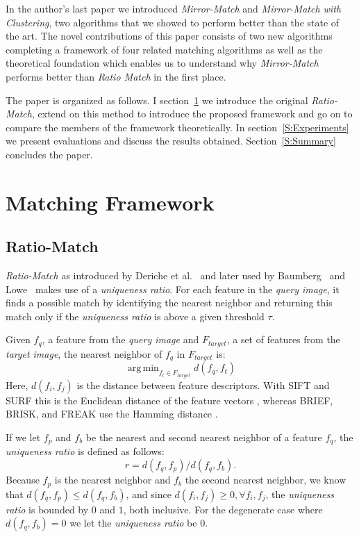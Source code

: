 \documentclass[10pt,journal,cspaper,compsoc]{IEEEtran}
\DeclareMathOperator*{\argmin}{arg\,min}
\begin{document}
In the author's last paper we introduced \emph{Mirror-Match} and 
\emph{Mirror-Match with Clustering}, two algorithms that we showed to 
perform better than the state of the art. The novel contributions of 
this paper consists of two new algorithms completing a framework of four 
related matching algorithms as well as the theoretical foundation which 
enables us to understand why \emph{Mirror-Match} performs better than 
\emph{Ratio Match} in the first place.

The paper is organized as follows. I section~\ref{S:MatchingMethods} we 
introduce the original \emph{Ratio-Match}, extend on this method to 
introduce the proposed framework and go on to compare the members of the 
framework theoretically.  In section~\ref{S:Experiments} we present 
evaluations and discuss the results obtained.  Section~\ref{S:Summary} 
concludes the paper.

\section{Matching Framework}
\label{S:MatchingMethods}
%
\subsection{Ratio-Match}
%
\emph{Ratio-Match} as introduced by Deriche et al.\ 
\cite{deriche1994robust} and later used by 
Baumberg~\cite{baumberg2000reliable} and Lowe~\cite{lowe2004sift} makes 
use of a \emph{uniqueness ratio}. For each feature in the \emph{query 
image}, it finds a possible match by identifying the nearest neighbor and 
returning this match only if the \emph{uniqueness ratio} is above a 
given threshold $\tau$. 

Given $f_q$, a feature from the \emph{query 
image} and $F_{target}$, a set of features from the \emph{target image}, 
the nearest neighbor of $f_q$ in $F_{target}$ is:
\begin{equation*}
    \argmin_{f_t \in F_{target}} d(f_q, f_t)
\end{equation*}
Here, $d(f_i, f_j)$ is the distance between feature descriptors.  
With SIFT and SURF this is the Euclidean distance of the feature vectors
\cite{lowe2004sift,bay2006surf}, whereas BRIEF, BRISK, and FREAK 
use the Hamming distance \cite{leutenegger2011brisk,calonder2010brief,alahi2012freak}.  

If we let $f_p$ and $f_b$ be the nearest and second nearest neighbor of a feature $f_q$, 
the \emph{uniqueness ratio} is defined as follows:
\begin{equation*}
    r = d(f_q, f_p) / d(f_q, f_b).
\end{equation*}
Because $f_p$ is the nearest neighbor and $f_b$ the second nearest 
neighbor, we know that $d(f_q, f_p) \leq d(f_q, f_b)$, and since $d(f_i, 
f_j) \geq 0, \forall f_i,f_j$, the \emph{uniqueness ratio} is bounded by $0$ 
and $1$, both inclusive. For the degenerate case where $d(f_q, f_b) = 0$
we let the \emph{uniqueness ratio} be $0$.
\end{document}
